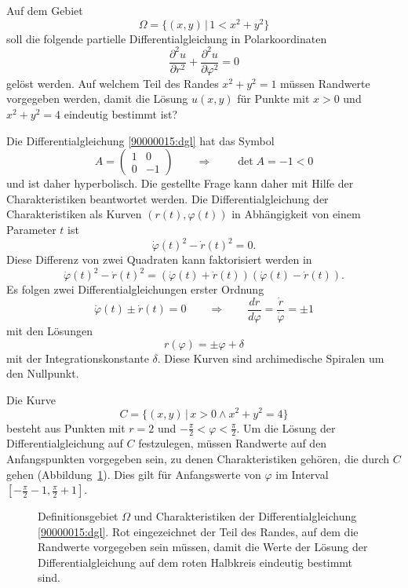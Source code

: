 Auf dem Gebiet
\[
\Omega = \{ (x,y)\,|\, 1 < x^2 + y^2\}
\]
soll die folgende partielle Differentialgleichung in Polarkoordinaten
\begin{equation}
\frac{\partial^2 u}{\partial r^2}
+
\frac{\partial^2 u}{\partial \varphi^2}
=
0
\label{90000015:dgl}
\end{equation}
gelöst werden.
Auf welchem Teil des Randes $x^2 +y^2 = 1$ müssen Randwerte vorgegeben
werden, damit die Lösung $u(x,y)$ für Punkte mit $x>0$ und $x^2 + y^2 = 4$
eindeutig bestimmt ist?

\begin{loesung}
Die Differentialgleichung \eqref{90000015:dgl} hat das Symbol
\[
A
=
\begin{pmatrix}
1&0\\
0&-1
\end{pmatrix}
\qquad\Rightarrow\qquad
\det A=-1<0
\]
und ist daher hyperbolisch.
Die gestellte Frage kann daher mit Hilfe der Charakteristiken beantwortet
werden.
Die Differentialgleichung der Charakteristiken als Kurven $(r(t),\varphi(t))$
in Abhängigkeit von einem Parameter $t$ ist
\[
\dot\varphi(t)^2 - \dot r(t)^2=0.
\]
Diese Differenz von zwei Quadraten kann faktorisiert werden in
\[
\dot\varphi(t)^2 - \dot r(t)^2
=
(\dot\varphi(t) + \dot r(t))
(\dot\varphi(t) - \dot r(t)).
\]
Es folgen zwei Differentialgleichungen erster Ordnung
\[
\dot\varphi(t)\pm\dot r(t) = 0
\qquad\Rightarrow\qquad
\frac{dr}{d\varphi}
=
\frac{\dot r}{\dot \varphi}
=
\pm 1
\]
mit den Lösungen
\[
r(\varphi) =  \pm \varphi + \delta
\]
mit der Integrationskonstante $\delta$.
Diese Kurven sind archimedische Spiralen um den Nullpunkt.

Die Kurve 
\[
C
=
\{ (x,y)\,|\, x>0\wedge x^2 +y^2=4\}
\]
besteht aus Punkten mit $r=2$ und $-\frac{\pi}{2}<\varphi<\frac{\pi}2$.
Um die Lösung der Differentialgleichung auf $C$ festzulegen, müssen
Randwerte auf den Anfangspunkten vorgegeben sein, zu denen Charakteristiken
gehören, die durch $C$ gehen (Abbildung~\ref{90000015:fig}).
Dies gilt für Anfangswerte von $\varphi$ im Interval
$[-\frac{\pi}2-1,\frac{\pi}2+1]$.
\begin{figure}
\centering
{}
\caption{Definitionsgebiet $\Omega$ und Charakteristiken der
Differentialgleichung \eqref{90000015:dgl}.
Rot eingezeichnet der Teil des Randes, auf dem die Randwerte vorgegeben
sein müssen, damit die Werte der Lösung der Differentialgleichung auf dem
roten Halbkreis eindeutig bestimmt sind.
\label{90000015:fig}}
\end{figure}
\end{loesung}


